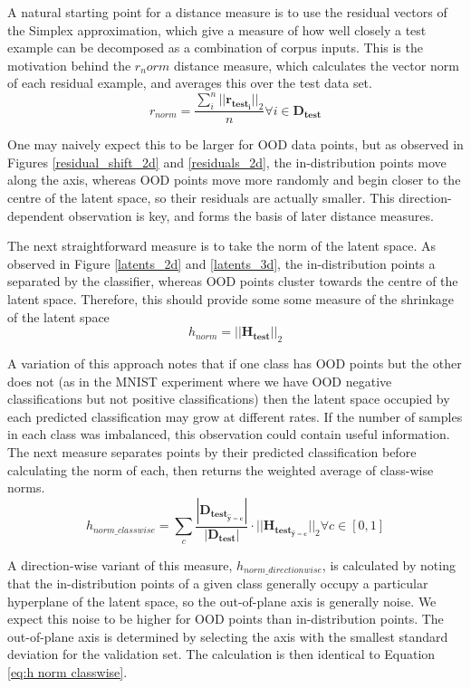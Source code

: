 \documentclass{article}
\begin{document}
A natural starting point for a distance measure is to use the residual vectors of the Simplex approximation, which give a measure of how well closely a test example can be decomposed as a combination of corpus inputs. This is the motivation behind the $r_norm$ distance measure, which calculates the vector norm of each residual example, and averages this over the test data set.
\begin{equation}
\label{eq:r norm}
	r_{norm} = \frac{\sum_i^n ||\bm{r_{test_i}}||_2}{n} \forall i \in \bm{D_{test}}
\end{equation}

One may naively expect this to be larger for OOD data points, but as observed in Figures \ref{residual_shift_2d} and \ref{residuals_2d}, the in-distribution points move along the axis, whereas OOD points move more randomly and begin closer to the centre of the latent space, so their residuals are actually smaller. This direction-dependent observation is key, and forms the basis of later distance measures.

The next straightforward measure is to take the norm of the latent space. As observed in Figure \ref{latents_2d} and \ref{latents_3d}, the in-distribution points a separated by the classifier, whereas OOD points cluster towards the centre of the latent space. Therefore, this should provide some some measure of the shrinkage of the latent space
\begin{equation}
\label{eq:h norm}
	h_{norm} = ||\bm{H_{test}}||_2
\end{equation}

A variation of this approach notes that if one class has OOD points but the other does not (as in the MNIST experiment where we have OOD negative classifications but not positive classifications) then the latent space occupied by each predicted classification may grow at different rates. If the number of samples in each class was imbalanced, this observation could contain useful information. The next measure separates points by their predicted classification before calculating the norm of each, then returns the weighted average of class-wise norms.
\begin{equation}
\label{eq:h norm classwise}
	h_{norm\_classwise} =\sum_c \frac{|\bm{D_{test_{\hat{y}=c}}}|}{|\bm{D_{test}}|} \cdot ||\bm{H_{test_{\hat{y}=c}}}||_2 \forall c \in [0, 1]
\end{equation}

A direction-wise variant of this measure, $h_{norm\_directionwise}$, is calculated by noting that the in-distribution points of a given class generally occupy a particular hyperplane of the latent space, so the out-of-plane axis is generally noise. We expect this noise to be higher for OOD points than in-distribution points. The out-of-plane axis is determined by selecting the axis with the smallest standard deviation for the validation set. The calculation is then identical to Equation \ref{eq:h norm classwise}.
\end{document}
